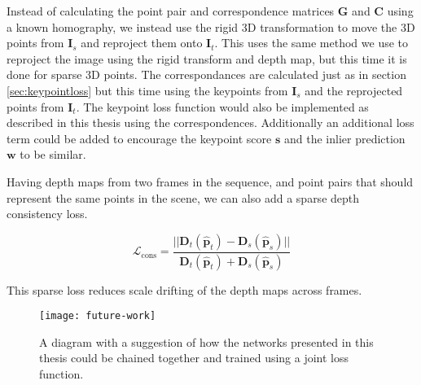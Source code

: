 Instead of calculating the point pair and correspondence matrices $\textbf{G}$ and $\textbf{C}$ using a known homography, we instead use the rigid 3D transformation to move the 3D points from $\textbf{I}_s$ and reproject them onto $\textbf{I}_t$. This uses the same method we use to reproject the image using the rigid transform and depth map, but this time it is done for sparse 3D points. The correspondances are calculated just as in section \ref{sec:keypointloss} but this time using the keypoints from $\textbf{I}_s$ and the reprojected points from $\textbf{I}_t$. The keypoint loss function would also be implemented as described in this thesis using the correspondences. Additionally an additional loss term could be added to encourage the keypoint score $\textbf{s}$ and the inlier prediction $\textbf{w}$ to be similar.

Having depth maps from two frames in the sequence, and point pairs that should represent the same points in the scene, we can also add a sparse depth consistency loss.

\begin{equation}
\mathcal{L}_{\mathrm{cons}}=\frac{
||\textbf{D}_t(\hat{\textbf{p}}_t) - \textbf{D}_s(\hat{\textbf{p}}_s)||
}{
\textbf{D}_t(\hat{\textbf{p}}_t) + \textbf{D}_s(\hat{\textbf{p}}_s)
}
\end{equation}

This sparse loss reduces scale drifting of the depth maps across frames.

\begin{figure}[H]
	\centering
	\texttt{[image: future-work]}
	\caption{A diagram with a suggestion of how the networks presented in this thesis could be chained together and trained using a joint loss function.}
	\label{fig:futurework}
\end{figure}
